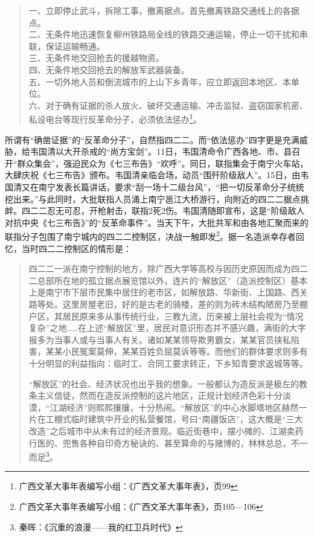 \begin{quote}

一、立即停止武斗，拆除工事，撤离据点。首先撤离铁路交通线上的各据点。\\
二、无条件地迅速恢复柳州铁路局全线的铁路交通运输，停止一切干扰和串联，保证运输畅通。\\
三、无条件地交回抢去的援越物资。\\
四、无条件地交回抢去的解放军武器装备。\\
五、一切外地人员和倒流城市的上山下乡青年，应立即返回本地区、本单位。\\
六、对于确有证据的杀人放火、破坏交通运输、冲击监狱、盗窃国家机密、私设电台等现行反革命分子，必须依法惩办\footnote{广西文革大事年表编写小组：《广西文革大事年表》，页99}。

\end{quote}

所谓有“确凿证据”的“反革命分子”，自然指四二二。而“依法惩办”四字更是充满威胁，给韦国清以大开杀戒的“尚方宝剑”。11日，韦国清命令广西各地、市、县召开“群众集会”，强迫民众为《七三布告》“欢呼”。同日，联指集会于南宁火车站，大肆庆祝《七三布告》颁布。韦国清亲临会场，动员“围歼阶级敌人”。15日，由韦国清又在南宁发表长篇讲话，要求“刮一场十二级台风”，“把一切反革命分子统统挖出来。”与此同时，大批联指人员涌上南宁邕江大桥游行，向附近的四二二据点挑衅。四二二忍无可忍，开枪射击，联指2死2伤。韦国清随即宣布，这是“阶级敌人对抗中央《七三布告》”的“反革命事件”。当天下午，大批共军和由各地汇聚而来的联指分子包围了南宁城内的四二二控制区，决战一触即发\footnote{广西文革大事年表编写小组：《广西文革大事年表》，页105—106}。据一名造派幸存者回忆，当时四二二控制区的情形是：

\begin{quote}
四二二一派在南宁控制的地方，除广西大学等高校与因历史原因而成为四二二总部所在地的孤立据点展览馆以外，连片的“解放区”（造派控制区）基本上是南宁市下层市民集中居住的老市区，如解放路、华新街、上国路、西关路等处。这里房屋老旧，好的是古老的骑楼，差的则为砖木结构陋房乃至棚户区，其居民原来多从事传统行业，三教九流，历来被上层社会视为“情况复杂”之地……在上述“解放区”里，居民对意识形态并不感兴趣，满街的大字报多为当事人或与当事人有关。诸如某某领导欺男霸女，某某官员挟私陷害，某某小民冤案莫伸，某某百姓负屈莫诉等等。而他们的群体要求则多有十分明显的利益指向：临时工、合同工要求转正，下乡知青要求返城等等。

“解放区”的社会、经济状况也出乎我的想象。一般都认为造反派是极左的教条主义信徒，然而在造反派控制的这片地区，正规计划经济色彩十分淡漠，“江湖经济”则熙熙攘攘，十分热闹。“解放区”的中心水脚塔地区赫然一片在工棚式临时建筑中开业的私营餐馆，号曰“南疆饭店”，这大概是“三大改造”之后城市中从未有过的经济景观。临近街巷中，摆小摊的、江湖卖药行医的、兜售各种自印奇方秘诀的、甚至算命的与赌博的，林林总总，不一而足\footnote{秦晖：《沉重的浪漫——我的红卫兵时代》}。

\end{quote}

